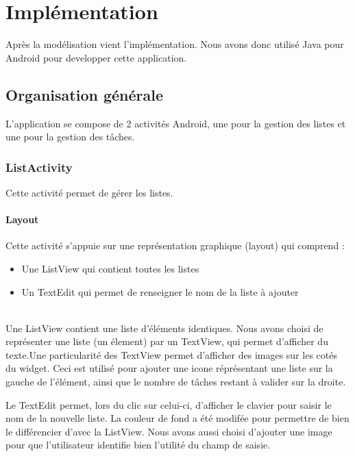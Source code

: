 \documentclass[a4paper, 11pt, french]{report}
\begin{document}
\chapter{Implémentation}
Après la modélisation vient l'implémentation. Nous avons donc utilisé Java pour Android pour developper cette application. 

\section{Organisation générale} %
L'application se compose de 2 activités Android, une pour la gestion des listes et une pour la gestion des tâches.

\subsection{ListActivity} %
Cette activité permet de gérer les listes.
	\subsubsection{Layout}
	Cette activité s'appuie sur une représentation graphique (layout) qui comprend : 
	\begin{itemize}
		\item Une ListView qui contient toutes les listes
		\item Un TextEdit qui permet de renseigner le nom de la liste à ajouter
	\end{itemize}
	~\\
	Une ListView contient une liste d'éléments identiques. Nous avons choisi de représenter une liste (un élement) par un TextView, qui permet d'afficher du texte.Une particularité des TextView permet d'afficher des images sur les cotés du widget. Ceci est utilisé pour ajouter une icone réprésentant une liste sur la gauche de l'élément, ainsi que le nombre de tâches restant à valider sur la droite.
	
	Le TextEdit permet, lors du clic sur celui-ci, d'afficher le clavier pour saisir le nom de la nouvelle liste. La couleur de fond a été modifée pour permettre de bien le différencier d'avec la ListView. Nous avons aussi choisi d'ajouter une image pour que l'utilisateur identifie bien l'utilité du champ de saisie.
	
\end{document}
